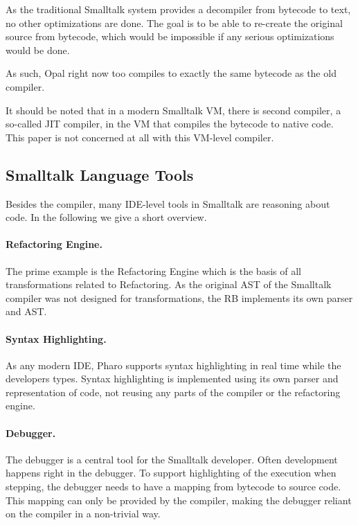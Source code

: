 \documentclass[preprint,10pt]{sigplanconf}
\begin{document}
As the traditional Smalltalk system provides a decompiler from bytecode to text, no other optimizations are done. The goal is to be able to re-create  the original source
from bytecode, which would be impossible if any serious optimizations would be done.

As such, Opal right now too compiles to exactly the same bytecode as the old compiler. 

It should be noted that in a modern Smalltalk VM, there is second compiler, a so-called JIT compiler, in the VM that compiles
the bytecode to native code. This paper is not concerned at all with this VM-level compiler.

\subsection{Smalltalk Language Tools}

Besides the compiler, many IDE-level tools in Smalltalk are reasoning about code. In the following we give a short overview.

\paragraph{Refactoring Engine.}
The prime example is the Refactoring Engine \cite{Robe97a} which is the basis of all transformations
related to Refactoring. As the original AST of the Smalltalk compiler was not designed for
transformations, the RB implements its own parser and AST.

\paragraph{Syntax Highlighting.}
As any modern IDE, Pharo supports syntax highlighting in real time while the developers types. Syntax highlighting is
implemented using its own parser and representation of code, not reusing any parts of the compiler or the refactoring
engine.

\paragraph{Debugger.}
The debugger is a central tool for the Smalltalk developer. Often development happens right in the debugger. 
To support highlighting of the execution when stepping, the debugger needs to have a mapping from bytecode to source code.
This mapping can only be provided by the compiler, making the debugger reliant on the compiler in a non-trivial way.
\end{document}
